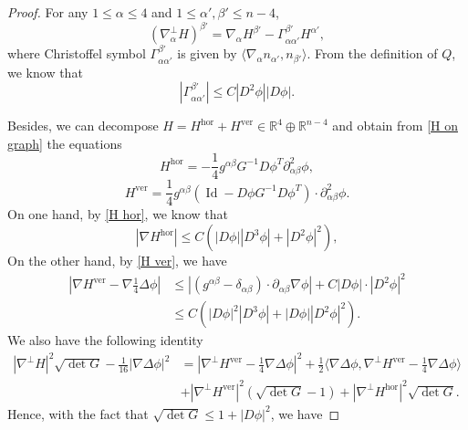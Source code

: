 \documentclass[11pt,letterpaper]{amsart}
\DeclareMathOperator{\Id}{Id}
\theoremstyle{definition}
\theoremstyle{remark}
\numberwithin{equation}{section}
\begin{document}
\begin{proof}
For any $ 1\leqslant \alpha \leqslant 4$ and $1 \leqslant \alpha', \beta' \leqslant n-4$,
\begin{equation}\label{perp nabla H}
    (\nabla_{\alpha}^\perp H)^{\beta'}=\nabla_{\alpha} H^{\beta'} -\Gamma_{\alpha\alpha'}^{\beta'} H^{\alpha'},
\end{equation}
where Christoffel symbol $\Gamma_{\alpha\alpha'}^{\beta'}$ is given by $\langle \nabla_{\alpha} n_{\alpha'}, n_{\beta'}\rangle$. From the definition of $Q$, we know that
\begin{equation}
    |\Gamma_{\alpha\alpha'}^{\beta'}|\leqslant C|D^2\phi||D\phi|.
\end{equation}

Besides, we can decompose $H=H^{\text{hor}}+H^{\text{ver}}\in \mathbb{R}^4 \oplus \mathbb{R}^{n-4}$ and obtain from \ref{H on graph} the equations
\begin{equation}\label{H hor}
   H^{\text{hor}}=-\frac{1}{4}g^{\alpha \beta}G^{-1}D \phi^{T} \partial_{\alpha \beta}^2 \phi,
\end{equation}
\begin{equation}\label{H ver}
    H^{\text{ver}}=\frac{1}{4}g^{\alpha \beta}(\Id- D \phi G^{-1} D \phi^{T})\cdot \partial_{\alpha \beta}^{2} \phi.
\end{equation}
On one hand, by \ref{H hor}, we know that
\begin{equation}
    |\nabla H^{\text{hor}}| \leqslant C(|D \phi||D^3 \phi|+|D^2 \phi|^2),
\end{equation}
On the other hand, by \ref{H ver}, we have 
\begin{align}
    |\nabla H^{\text{ver}}-\nabla \frac{1}{4}\Delta \phi| &\leqslant \left|(g^{\alpha\beta}-\delta_{\alpha\beta})\cdot\partial_{\alpha\beta} \nabla \phi\right|+C |D\phi| \cdot \left|D^2 \phi\right|^2\\
    &\leqslant C\left(|D \phi|^2 |D^3 \phi|+|D\phi||D^2 \phi|^2\right).
\end{align}
We also have the following identity
\begin{align}
  |\nabla^\perp H|^2 \sqrt{\det G}-\frac{1}{16}|\nabla \Delta\phi|^2&=|\nabla^\perp H^{\text{ver}}-\frac{1}{4}\nabla \Delta \phi|^2+\frac{1}{2}\langle\nabla\Delta \phi, \nabla^\perp H^{\text{ver}}-\frac{1}{4}\nabla\Delta\phi\rangle\\
  &+|\nabla^\perp H^{\text{ver}}|^2 (\sqrt{\det{G}}-1)+|\nabla^\perp H^{\text{hor}}|^2 \sqrt{\det{G}}.
\end{align}
Hence, with the fact that $\sqrt{\det G}\leqslant 1+|D\phi|^2$, we have 

\end{proof}
\end{document}
